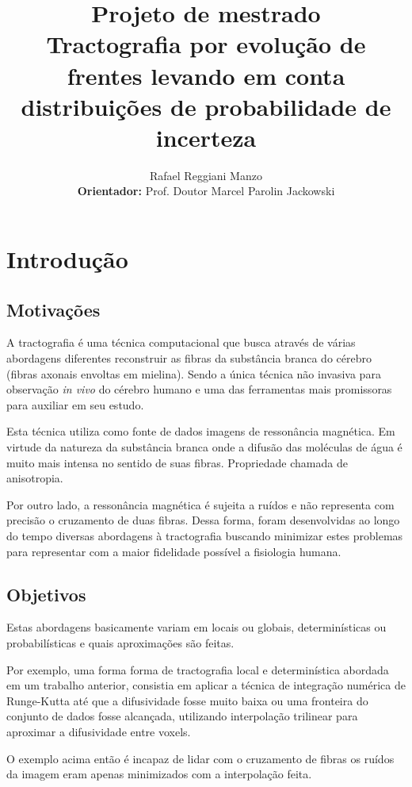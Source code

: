 \documentclass[a4paper,11pt]{report}
\title{Projeto de mestrado\\
       \textbf{Tractografia por evolução de frentes levando em conta distribuições de probabilidade de incerteza}}
\author{Rafael Reggiani Manzo\\
        \textbf{Orientador:} Prof. Doutor Marcel Parolin Jackowski}
\begin{document}
\maketitle
\tableofcontents

\begin{abstract}
\end{abstract}

\chapter{Introdução}
  \section{Motivações}
  A tractografia é uma técnica computacional que busca através de várias abordagens diferentes reconstruir as fibras da substância branca do cérebro (fibras axonais envoltas em mielina). Sendo a única técnica não invasiva para observação \textit{in vivo} do cérebro humano e uma das ferramentas mais promissoras para auxiliar em seu estudo.
  
  Esta técnica utiliza como fonte de dados imagens de ressonância magnética. Em virtude da natureza da substância branca onde a difusão das moléculas de água é muito mais intensa no sentido de suas fibras. Propriedade chamada de anisotropia.
  
  Por outro lado, a ressonância magnética é sujeita a ruídos e não representa com precisão o cruzamento de duas fibras. Dessa forma, foram desenvolvidas ao longo do tempo diversas abordagens à tractografia buscando minimizar estes problemas para representar com a maior fidelidade possível a fisiologia humana.
  
  \section{Objetivos}
  Estas abordagens basicamente variam em locais ou globais, determinísticas ou probabilísticas e quais aproximações são feitas. 
  
  Por exemplo, uma forma forma de tractografia local e determinística abordada em um trabalho anterior, consistia em aplicar a técnica de integração numérica de Runge-Kutta até que a difusividade fosse muito baixa ou uma fronteira do conjunto de dados fosse alcançada, utilizando interpolação trilinear para aproximar a difusividade entre voxels.
  
  O exemplo acima então é incapaz de lidar com o cruzamento de fibras os ruídos da imagem eram apenas minimizados com a interpolação feita.
  
\end{document}
